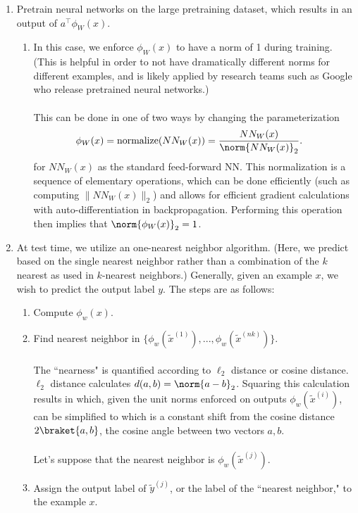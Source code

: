 \begin{enumerate}
	\item Pretrain neural networks on the large pretraining dataset, which results in an output of $a^\top \phi_W(x)$.
	\begin{enumerate}
		\item In this case, we enforce $\phi_W(x)$ to have a norm of 1 during training. (This is helpful in order to not have dramatically different norms for different examples, and is likely applied by research teams such as Google who release pretrained neural networks.) \\ \\
		This can be done in one of two ways by changing the parameterization
		\begin{align}
			\phi_W(x) &= \text{normalize}(NN_W(x)) = \frac{NN_W(x)}{\norm{NN_W(x)}_2}. \nonumber
		\end{align}
		for $NN_W(x)$ as the standard feed-forward NN. This normalization is a sequence of elementary operations, which can be done efficiently (such as computing $\lVert NN_W(x) \rVert_2$) and allows for efficient gradient calculations with auto-differentiation in backpropagation. Performing this operation then implies that $\norm{\phi_W(x)}_2 = 1$.
	\end{enumerate}
	\item At test time, we utilize an one-nearest neighbor algorithm. (Here, we predict based on the single nearest neighbor rather than a combination of the $k$ nearest as used in $k$-nearest neighbors.) Generally, given an example $x$, we wish to predict the output label $y$. The steps are as follows:
	\begin{enumerate}
		\item Compute $\phi_w(x)$.
		\item Find nearest neighbor in
		$\{\phi_w(\tilde{x}^{(1)}), ..., \phi_w(\tilde{x}^{(nk)})\}$. \\ \\
		The ``nearness" is quantified according to $\ell_2$ distance or cosine distance. $\ell_2$ distance calculates $d(a,b) = \norm{a - b}_2$. Squaring this calculation results in
		which, given the unit norms enforced on outputs $\phi_w(\tilde{x}^{(i)})$, can be simplified to
		which is a constant shift from the cosine distance $2\braket{a,b}$, the cosine angle between two vectors $a,b$. \\
		\\ Let's suppose that the nearest neighbor is $\phi_w(\tilde{x}^{(j)})$. \\
		\item Assign the output label of $\tilde{y}^{(j)}$, or the label of the ``nearest neighbor," to the example $x$.
	\end{enumerate}
\end{enumerate}

